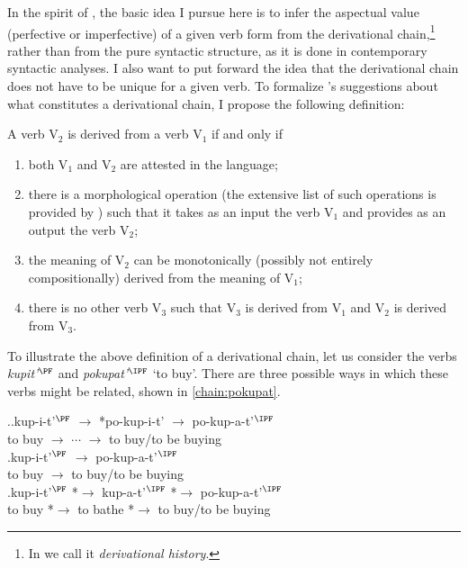 In the spirit of \citet{Karcevski:27}, the basic idea I pursue here is to infer the aspectual value (perfective or imperfective) of a given verb form from the derivational chain,\footnote{In \citet{ZinovaFilip:14b} we call it \textit{derivational history}.} rather than from the pure syntactic structure, as it is done in contemporary syntactic analyses. I also want to put forward the idea that the derivational chain does not have to be unique for a given verb. To formalize \citeauthor{Karcevski:27}'s \citeyear{Karcevski:27} suggestions about what constitutes a derivational chain, I propose the following definition:

\begin{definition}\label{def:history}
A verb V$_2$ is derived from a verb V$_1$ if and only if
\begin{enumerate}
\item both V$_1$ and V$_2$ are attested in the language;
\item there is a morphological operation (the extensive list of such operations is provided by \citealt{Shvedova:82}) such that it takes as an input the verb V$_1$ and provides as an output the verb V$_2$;
\item the meaning of V$_2$ can be monotonically (possibly not entirely compositionally) derived from the meaning of V$_1$;
\item there is no other verb V$_3$ such that V$_3$ is derived from V$_1$ and V$_2$ is derived from V$_3$.
\end{enumerate}
\end{definition}

To illustrate the above definition of a derivational chain, let us consider the verbs \textit{kupit'$^{\PF}$} and \textit{pokupat'$^{\IPF}$} `to buy'. There are three possible ways in which these verbs might be related, shown in \ref{chain:pokupat}.

\ex.\label{chain:pokupat}\ag.\label{chain:pokupat1}kup-i-t'$^{\PF}$ $\rightarrow$ *po-kup-i-t' $\rightarrow$ po-kup-a-t'$^{\IPF}$\\	
{to buy} $\rightarrow$ $\cdots$ $\rightarrow$ {to buy/to be buying}\\
\bg.\label{chain:pokupat2}kup-i-t'$^{\PF}$ $\rightarrow$ po-kup-a-t'$^{\IPF}$\\
{to buy} $\rightarrow$ {to buy/to be buying}\\
\bg.\label{chain:pokupat3}kup-i-t'$^{\PF}$ *$\rightarrow$ kup-a-t'$^{\IPF}$ *$\rightarrow$ po-kup-a-t'$^{\IPF}$\\
{to buy} *$\rightarrow$ {to bathe} *$\rightarrow$ {to buy/to be buying}\\

